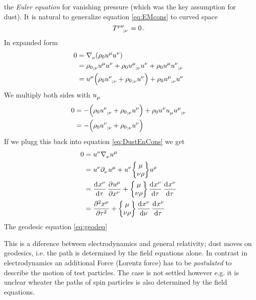 the \emph{Euler equation} for vanishing pressure (which was the key assumption
for dust). It is natural to generalize equation \eqref{eq:EMcons} to curved
space
\begin{equation}
\tensor{T}{^\mu^\nu_{;\nu}}=0\,.
\end{equation}
In expanded form
\begin{equation}
\begin{split}
0
&=\tensor{\nabla}{_\nu}\left(\rho_0\tensor{u}{^\mu}\tensor{u}{^\nu}\right)\\
&=\tensor{{\rho_0}}{_{;\nu}}\tensor{u}{^\mu}\tensor{u}{^\nu}
+\rho_0\tensor{u}{^\mu_{;\nu}}\tensor{u}{^\nu}
+\rho_0\tensor{u}{^\mu}\tensor{u}{^\nu_{;\nu}}\\
&=\tensor{u}{^\mu}\left(\rho_0\tensor{u}{^\nu_{;\nu}}+\tensor{{\rho_0}}{_{;\nu}}\tensor{u}{^\nu}\right)
+\rho_0\tensor{u}{^\mu_{;\nu}}\tensor{u}{^\nu} \label{eq:DustEnCons}
\end{split}
\end{equation}
We multiply both sides with $\tensor{u}{_\mu}$
\begin{equation}
\begin{split}
0
&=-\left(\rho_0\tensor{u}{^\nu_{;\nu}}+\tensor{{\rho_0}}{_{;\nu}}\tensor{u}{^\nu}\right)
+\rho_0\tensor{u}{^\nu}\tensor{u}{_\mu}\tensor{u}{^\mu_{;\nu}}\\
&=-\left(\rho_0\tensor{u}{^\nu_{;\nu}}
+\tensor{{\rho_0}}{_{;\nu}}\tensor{u}{^\nu}\right)
\end{split}
\end{equation}
If we plugg this back into equation \eqref{eq:DustEnCons} we get
\begin{equation}
\begin{split}
0&=\tensor{u}{^\nu}\tensor{\nabla}{_\nu}\tensor{u}{^\mu}\\
&=\tensor{u}{^\nu}\tensor{\partial}{_\nu}\tensor{u}{^\mu}
+\tensor{u}{^\nu}\cSym{\mu}{\nu}{\rho}\tensor{u}{^\rho}\\
&=\dod{\tensor{x}{^\nu}}{\tau}\dpd{\tensor{u}{^\mu}}{\tensor{x}{^\nu}}
+\cSym{\mu}{\nu}{\rho}\dod{\tensor{x}{^\nu}}{\tau}\dod{\tensor{x}{^\nu}}{\tau}\\
&=\dpd[2]{\tensor{x}{^\mu}}{\tau}
+\cSym{\mu}{\nu}{\rho}\dod{\tensor{x}{^\nu}}{\nu}\dod{\tensor{x}{^\nu}}{\tau}\\
\end{split}
\end{equation}
The geodesic equation \eqref{eq:geodeq}
\begin{remark}
This is a diference between electrodynamics and general relativity; dust moves
on geodesics, i.e. the path is determined by the field equations alone. In contrast
in electrodynamics an additional Force (Lorentz force) has to be
\emph{postulated} to describe the motion of test particles. The case is not
settled however e.g. it is unclear wheater the paths of spin particles is also
determined by the field equations.
\end{remark}